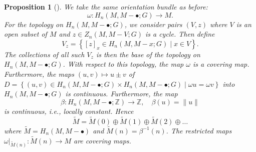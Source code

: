 \documentclass[reqno]{amsart}
\newtheorem{proposition}[theorem]{Proposition}
\theoremstyle{definition}
\theoremstyle{remark}
\begin{document}
\begin{proposition}[]
    We take the same
    orientation bundle as before:
    \[
    \omega \colon H_n (M, M - \bullet;G) \to 
    M.
    \] 
    For the topology on $H_n (M, M - \bullet;G)$, we
    consider pairs
    $(V,z)$ where $V$ is an open subset of $M$ and
    $z \in Z_n (M, M-V;G)$ is a cycle.
    Then define
    \[
    V_z = \left\{ \left[ z \right]_x \in 
    H_n (M, M -x;G)  \mid x \in V \right\} .
    \] 
    The collections of all such 
    $V_z$ is then the base of the topology on
    $H_n (M, M - \bullet;G)$.
    With respect to this topology, the map
    $\omega$ is a covering map.
    Furthermore, the maps
    $(u,v) \mapsto u \pm v$ of
    $D = \left\{ (u,v) \in 
    H_n (M, M- \bullet;G) \times H_n (M, M- \bullet;G)
 \mid \omega u = \omega v \right\} $ into
 $H_n (M, M- \bullet;G)$ is continuous.
 Furthermore, the map
 \[
 \beta \colon H_n (M, M- \bullet; \mathbb{Z}) \to \mathbb{Z},
 \quad
 \beta(u) = \|u\| 
 \] 
 is continuous, i.e., locally constant. Hence
 \[
 \tilde{M} = \tilde{M}(0) \oplus \tilde{M}(1) \oplus
 \tilde{M}(2) \oplus \ldots
 \] 
 where
 $\tilde{M} = H_n (M, M - \bullet)$ and
 $\tilde{M}(n) = 
 \beta^{-1}(n)$.
 The restricted maps
 $\omega|_{\tilde{M}(n)} \colon \tilde{M}(n) \to M$ are
 covering maps.
\end{proposition}
\end{document}
